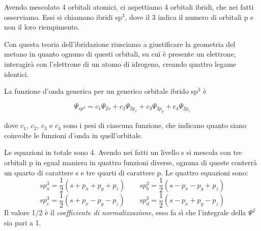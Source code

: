 Avendo mescolato 4 orbitali atomici, ci aspettiamo 4 orbitali ibridi, che nei fatti osserviamo. Essi si chiamano ibridi sp$^3$, dove il 3 indica il numero di orbitali p e non il loro riempimento. 

Con questa teoria dell'ibridazione riusciamo a giustificare la geometria del metano in quanto ognuno di questi orbitali, su cui è presente un elettrone, interagirà con l'elettrone di un atomo di idrogeno, creando quattro legame identici.

\vspace{0.2cm}La funzione d'onda generica per un generico orbitale ibrido sp$^3$ è

$$\Psi_{sp^3}=c_1\Psi_{2s} + c_2\Psi_{2p_x} + c_3\Psi_{2p_y} + c_4\Psi_{2p_z}$$

dove $c_1$, $c_2$, $c_3$ e $c_4$ sono i pesi di ciascuna funzione, che indicano quanto siano coinvolte le funzioni d'onda in quell'orbitale.

Le equazioni in totale sono 4. Avendo nei fatti un livello s si mescola con tre orbitali p in egual maniera in quattro funzioni diverse, ognuna di queste conterrà un quarto di carattere s e tre quarti di carattere p. Le quattro equazioni sono:
$$sp_a^3=\frac{1}{2}(s + p_x + p_y + p_z) \qquad sp_b^3=\frac{1}{2}(s - p_x - p_y + p_z)$$
$$sp_c^3=\frac{1}{2}(s + p_x - p_y - p_z) \qquad sp_d^3=\frac{1}{2}(s - p_x + p_y - p_z)$$
Il valore 1/2 è il \textit{coefficiente di normalizzazione}, esso fa sì che l'integrale della $\Psi^2$ sia pari a 1.

